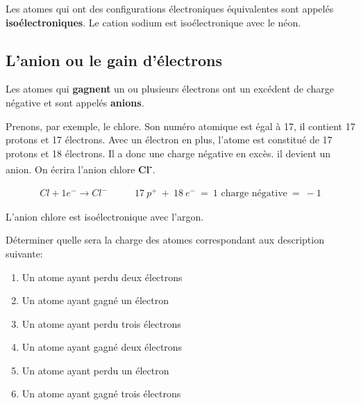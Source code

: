 \documentclass[
  11pt,
  a4paper,
  openany]{book}
\providecommand{\tightlist}{%
  \setlength{\itemsep}{0pt}\setlength{\parskip}{0pt}}
\begin{document}
Les atomes qui ont des configurations électroniques équivalentes sont appelés \textbf{isoélectroniques}. Le cation sodium est isoélectronique avec le néon.

\hypertarget{lanion-ou-le-gain-duxe9lectrons}{%
\subsection{L'anion ou le gain d'électrons}\label{lanion-ou-le-gain-duxe9lectrons}}

Les atomes qui \textbf{gagnent} un ou plusieurs électrons ont un excédent de charge négative et sont appelés \textbf{anions}.

Prenons, par exemple, le chlore. Son numéro atomique est égal à 17, il contient 17 protons et 17 électrons. Avec un électron en plus, l'atome est constitué de 17 protons et 18 électrons. Il a donc une charge négative en excès. il devient un anion. On écrira l'anion chlore \textbf{Cl\textsuperscript{-}}.

\[ \begin{split}
        Cl + 1e^- \rightarrow Cl^-
    \end{split}
    \qquad
    \begin{split}
        17\:p^{+}\:+\:18\:e^{-}\:=\:\text{1 charge négative}\:=\: -1
    \end{split} \]

L'anion chlore est isoélectronique avec l'argon.

\begin{Exercise}

Déterminer quelle sera la charge des atomes correspondant aux description suivante:

\begin{enumerate}
\def\labelenumi{\arabic{enumi}.}
\tightlist
\item
  Un atome ayant perdu deux électrons\\
\item
  Un atome ayant gagné un électron\\
\item
  Un atome ayant perdu trois électrons\\
\item
  Un atome ayant gagné deux électrons\\
\item
  Un atome ayant perdu un électron\\
\item
  Un atome ayant gagné trois électrons
\end{enumerate}

\end{Exercise}
\end{document}
